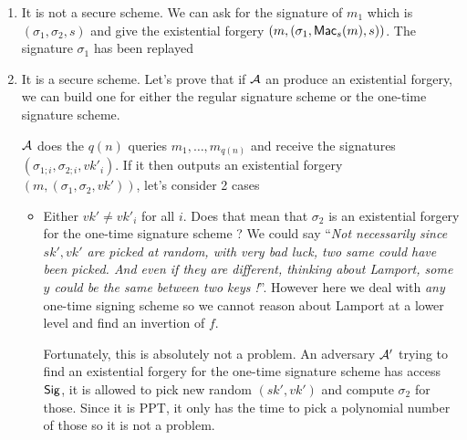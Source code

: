 \begin{solution}
  \begin{enumerate}
    \item
      It is not a secure scheme.
      We can ask for the signature of $m_1$ which is $(\sigma_1, \sigma_2, s)$ and give the existential forgery
      $(m, (\sigma_1, \operatorname{\mathsf{Mac}}_s(m), s))$.
      The signature $\sigma_1$ has been replayed
    \item
      It is a secure scheme.
      Let's prove that if $\mathcal{A}$ an produce an existential forgery,
      we can build one for either the regular signature scheme or the one-time signature scheme.

      $\mathcal{A}$ does the $q(n)$ queries $m_1, \ldots, m_{q(n)}$ and receive the signatures $(\sigma_{1;i}, \sigma_{2;i}, {vk'}_i)$.
      If it then outputs an existential forgery $(m, (\sigma_1, \sigma_2, vk'))$, let's consider 2 cases
      \begin{itemize}
        \item
          Either $vk' \neq {vk'}_i$ for all $i$.
          Does that mean that $\sigma_2$ is an existential forgery for the one-time signature scheme ?
          We could say ``\emph{Not necessarily since $sk',vk'$ are picked at random, with very bad luck, two same could have been picked.
          And even if they are different, thinking about Lamport, some $y$ could be the same between two keys !}''.
          However here we deal with \emph{any} one-time signing scheme so we cannot reason about Lamport at a lower level and find an invertion of $f$.

          Fortunately, this is absolutely not a problem.
          An adversary $\mathcal{A}'$ trying to find an existential forgery for the one-time signature scheme has access $\operatorname{\mathsf{Sig}}$,
          it is allowed to pick new random $(sk', vk')$ and compute $\sigma_2$ for those.
          Since it is PPT, it only has the time to pick a polynomial number of those so it is not a problem.


\end{itemize}
\end{enumerate}
\end{solution}

